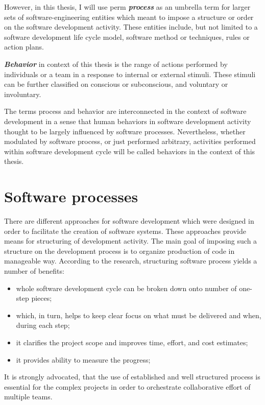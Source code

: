 However, in this thesis, I will use perm \textit{\textbf{process}} as an umbrella term for 
larger sets of software-engineering entities which meant to impose a structure or order on
the software development activity. These entities include, but not limited to a software 
development life cycle model, software method or techniques, rules or action plans. 

\textit{\textbf{Behavior}} in context of this thesis is the range of actions performed by 
individuals or a team in a response to internal or external stimuli. These stimuli can be
further classified on conscious or subconscious, and voluntary or involuntary. 

The terms process and behavior are interconnected in the context of software development
in a sense that human behaviors in software development activity thought to be largely influenced 
by software processes. Nevertheless, whether modulated by software process, or just 
performed arbitrary, activities performed within software development cycle will be called 
behaviors in the context of this thesis.

\section{Software processes}\label{software.processes}
There are different approaches for software development which were designed in order to 
facilitate the creation of software systems. These approaches provide means for 
structuring of development activity. The main goal of imposing such a structure on the 
development process is to organize production of code in manageable way. 
According to the research, structuring software process yields a number of benefits:
\begin{itemize}
 \item whole software development cycle can be broken down onto number of one-step pieces;
 \item which, in turn, helps to keep clear focus on what must be delivered and when, during each step;
 \item it clarifies the project scope and improves time, effort, and cost estimates;
 \item it provides ability to measure the progress;
\end{itemize}
It is strongly advocated, that the use of established and well structured process is 
essential for the complex projects in order to orchestrate collaborative effort 
of multiple teams. 

